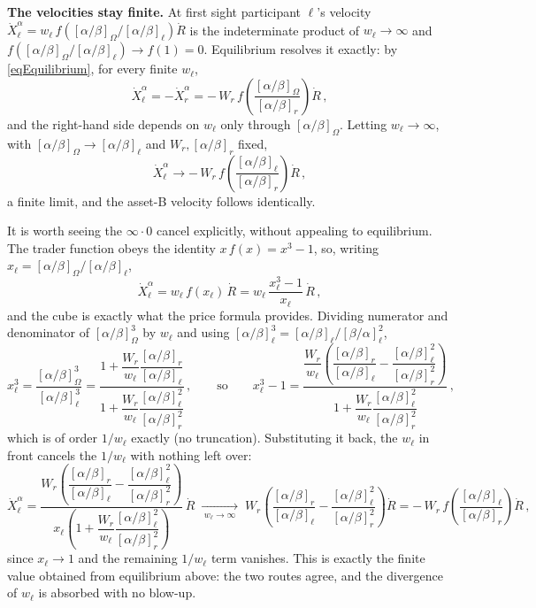 \documentclass[letterpaper]{article}
\newcommand{\priceAB}{\left[\alpha / \beta\right]}
\newcommand{\priceBA}{\left[\beta / \alpha\right]}
\begin{document}
\textbf{The velocities stay finite.} At first sight participant $\ell$'s velocity $\dot{X}_\ell^\alpha = w_\ell\, f\!\left(\priceAB_\Omega / \priceAB_\ell\right) \dot{R}$ is the indeterminate product of $w_\ell \to \infty$ and $f\!\left(\priceAB_\Omega / \priceAB_\ell\right) \to f(1) = 0$. Equilibrium resolves it exactly: by \eqref{eqEquilibrium}, for every finite $w_\ell$,
\begin{equation*}
    \dot{X}_\ell^\alpha = -\dot{X}_r^\alpha = -\,W_r\, f\!\left( \frac{\priceAB_\Omega}{\priceAB_r} \right) \dot{R} \,,
\end{equation*}
and the right-hand side depends on $w_\ell$ only through $\priceAB_\Omega$. Letting $w_\ell \to \infty$, with $\priceAB_\Omega \to \priceAB_\ell$ and $W_r, \priceAB_r$ fixed,
\begin{equation*}
    \dot{X}_\ell^\alpha \longrightarrow -\,W_r\, f\!\left( \frac{\priceAB_\ell}{\priceAB_r} \right) \dot{R} \,,
\end{equation*}
a finite limit, and the asset-B velocity follows identically.

It is worth seeing the $\infty \cdot 0$ cancel explicitly, without appealing to equilibrium. The trader function obeys the identity $x\,f(x) = x^3 - 1$, so, writing $x_\ell = \priceAB_\Omega / \priceAB_\ell$,
\begin{equation*}
    \dot{X}_\ell^\alpha = w_\ell\, f(x_\ell)\, \dot{R} = w_\ell\, \frac{x_\ell^3 - 1}{x_\ell}\, \dot{R} \,,
\end{equation*}
and the cube is exactly what the price formula provides. Dividing numerator and denominator of $\priceAB_\Omega^3$ by $w_\ell$ and using $\priceAB_\ell^3 = \priceAB_\ell / \priceBA_\ell^2$,
\begin{equation*}
    x_\ell^3 = \frac{\priceAB_\Omega^3}{\priceAB_\ell^3}
    = \frac{1 + \dfrac{W_r}{w_\ell}\dfrac{\priceAB_r}{\priceAB_\ell}}{1 + \dfrac{W_r}{w_\ell}\dfrac{\priceAB_\ell^2}{\priceAB_r^2}} \,,
    \qquad\text{so}\qquad
    x_\ell^3 - 1 = \frac{\dfrac{W_r}{w_\ell}\!\left(\dfrac{\priceAB_r}{\priceAB_\ell} - \dfrac{\priceAB_\ell^2}{\priceAB_r^2}\right)}{1 + \dfrac{W_r}{w_\ell}\dfrac{\priceAB_\ell^2}{\priceAB_r^2}} \,,
\end{equation*}
which is of order $1/w_\ell$ exactly (no truncation). Substituting it back, the $w_\ell$ in front cancels the $1/w_\ell$ with nothing left over:
\begin{equation*}
    \dot{X}_\ell^\alpha = \frac{W_r\!\left(\dfrac{\priceAB_r}{\priceAB_\ell} - \dfrac{\priceAB_\ell^2}{\priceAB_r^2}\right)}{x_\ell\!\left(1 + \dfrac{W_r}{w_\ell}\dfrac{\priceAB_\ell^2}{\priceAB_r^2}\right)}\, \dot{R}
    \;\xrightarrow[\;w_\ell \to \infty\;]{}\;
    W_r\!\left(\frac{\priceAB_r}{\priceAB_\ell} - \frac{\priceAB_\ell^2}{\priceAB_r^2}\right) \dot{R}
    = -\,W_r\, f\!\left(\frac{\priceAB_\ell}{\priceAB_r}\right)\dot{R} \,,
\end{equation*}
since $x_\ell \to 1$ and the remaining $1/w_\ell$ term vanishes. This is exactly the finite value obtained from equilibrium above: the two routes agree, and the divergence of $w_\ell$ is absorbed with no blow-up.
\end{document}
